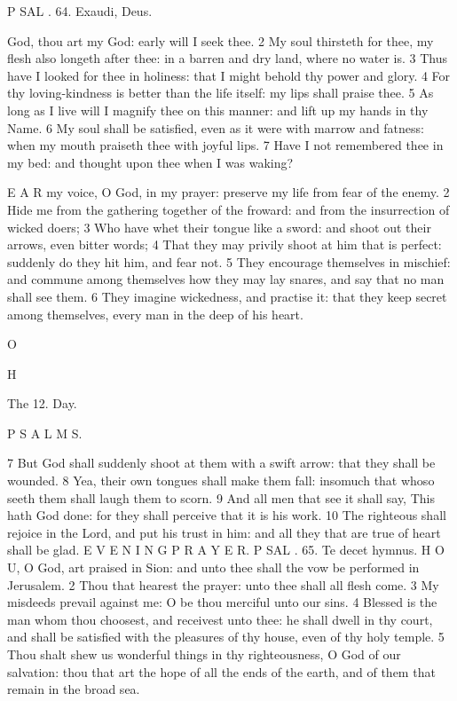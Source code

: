 P SAL . 64. Exaudi, Deus.

God, thou art my God: early will I seek thee. 2 My soul thirsteth for thee, my flesh also longeth after thee: in a barren and dry land, where no water is. 3 Thus have I looked for thee in holiness: that I might behold thy power and glory. 4 For thy loving-kindness is better than the life itself: my lips shall praise thee. 5 As long as I live will I magnify thee on this manner: and lift up my hands in thy Name. 6 My soul shall be satisfied, even as it were with marrow and fatness: when my mouth praiseth thee with joyful lips. 7 Have I not remembered thee in my bed: and thought upon thee when I was waking?

E A R my voice, O God, in my prayer: preserve my life from fear of the enemy. 2 Hide me from the gathering together of the froward: and from the insurrection of wicked doers; 3 Who have whet their tongue like a sword: and shoot out their arrows, even bitter words; 4 That they may privily shoot at him that is perfect: suddenly do they hit him, and fear not. 5 They encourage themselves in mischief: and commune among themselves how they may lay snares, and say that no man shall see them. 6 They imagine wickedness, and practise it: that they keep secret among themselves, every man in the deep of his heart.

O

H

The 12. Day.

P S A L M S.

7 But God shall suddenly shoot at them with a swift arrow: that they shall be wounded. 8 Yea, their own tongues shall make them fall: insomuch that whoso seeth them shall laugh them to scorn. 9 And all men that see it shall say, This hath God done: for they shall perceive that it is his work. 10 The righteous shall rejoice in the Lord, and put his trust in him: and all they that are true of heart shall be glad. E V E N I N G P R A Y E R. P SAL . 65. Te decet hymnus. H O U, O God, art praised in Sion: and unto thee shall the vow be performed in Jerusalem. 2 Thou that hearest the prayer: unto thee shall all flesh come. 3 My misdeeds prevail against me: O be thou merciful unto our sins. 4 Blessed is the man whom thou choosest, and receivest unto thee: he shall dwell in thy court, and shall be satisfied with the pleasures of thy house, even of thy holy temple. 5 Thou shalt shew us wonderful things in thy righteousness, O God of our salvation: thou that art the hope of all the ends of the earth, and of them that remain in the broad sea.

